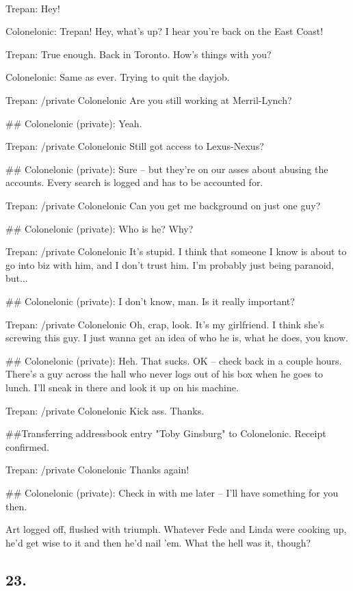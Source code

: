 {\raggedright
\tt
\addtolength{\parskip}{0.5\baselineskip}

Trepan: Hey!

Colonelonic: Trepan! Hey, what's up? I hear you're back on the East
Coast!

Trepan: True enough. Back in Toronto. How's things with you?

Colonelonic: Same as ever. Trying to quit the dayjob.

Trepan: /private Colonelonic Are you still working at
Merril-Lynch?

\#\# Colonelonic (private): Yeah.

Trepan: /private Colonelonic Still got access to Lexus-Nexus?

\#\# Colonelonic (private): Sure -- but they're on our asses about
abusing the accounts. Every search is logged and has to be
accounted for.

Trepan: /private Colonelonic Can you get me background on just one
guy?

\#\# Colonelonic (private): Who is he? Why?

Trepan: /private Colonelonic It's stupid. I think that someone I
know is about to go into biz with him, and I don't trust him. I'm
probably just being paranoid, but...

\#\# Colonelonic (private): I don't know, man. Is it really
important?

Trepan: /private Colonelonic Oh, crap, look. It's my girlfriend. I
think she's screwing this guy. I just wanna get an idea of who he
is, what he does, you know.

\#\# Colonelonic (private): Heh. That sucks. OK -- check back in a
couple hours. There's a guy across the hall who never logs out of
his box when he goes to lunch. I'll sneak in there and look it up
on his machine.

Trepan: /private Colonelonic Kick ass. Thanks.

\#\#Transferring addressbook entry "Toby Ginsburg" to Colonelonic.
Receipt confirmed.

Trepan: /private Colonelonic Thanks again!

\#\# Colonelonic (private): Check in with me later -- I'll have
something for you then.

}
\bigskip
Art logged off, flushed with triumph. Whatever Fede and Linda were
cooking up, he’d get wise to it and then he’d nail ’em. What the
hell was it, though?

\subsection{23.}


